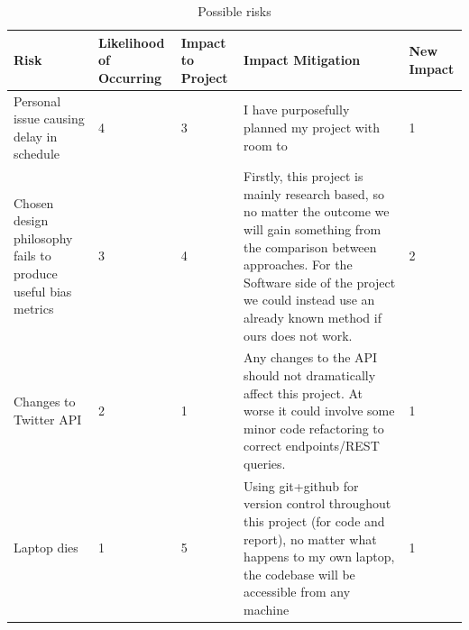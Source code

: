 \documentclass[a4paper,fleqn,12pt]{article}
\begin{document}
\begin{table}[h]
    \begin{tabular}{|p{25mm}|p{20mm}|p{13mm}|p{55mm}|p{14mm}|}
    \hline
        Risk & Likelihood of Occurring & Impact to Project & Impact Mitigation & New Impact \\
        \hline
        Personal issue causing delay in schedule & 4 & 3 & I have purposefully planned my project with room to & 1 \\
        \hline
        Chosen design philosophy fails to produce useful bias metrics & 3 & 4 & Firstly, this project is mainly research based, so no matter the outcome we will gain something from the comparison between approaches. For the Software side of the project we could instead use an already known method if ours does not work. & 2 \\
        \hline
        Changes to Twitter API & 2 & 1 & Any changes to the API should not dramatically affect this project. At worse it could involve some minor code refactoring to correct endpoints/REST queries. & 1\\
        \hline
        Laptop dies & 1 & 5 & Using git+github for version control throughout this project (for code and report), no matter what happens to my own laptop, the codebase will be accessible from any machine & 1\\
        \hline
    \end{tabular}
    \caption{Possible risks}
    \label{tab:risk}
\end{table}



\end{document}

